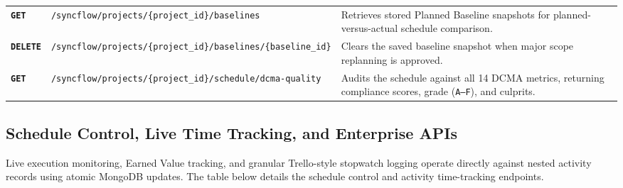 \begin{table}[H]
\begin{tabularx}{\textwidth}{p{1.3cm} >{\raggedright\arraybackslash}p{6.0cm} X}
\textbf{\texttt{GET}} & \texttt{/syncflow/projects/\{project\_id\}/\allowbreak baselines} & Retrieves stored Planned Baseline snapshots for planned-versus-actual schedule comparison. \\
\textbf{\texttt{DELETE}} & \texttt{/syncflow/projects/\{project\_id\}/\allowbreak baselines/\{baseline\_id\}} & Clears the saved baseline snapshot when major scope replanning is approved. \\
\textbf{\texttt{GET}} & \texttt{/syncflow/projects/\{project\_id\}/\allowbreak schedule/dcma-quality} & Audits the schedule against all 14 DCMA metrics, returning compliance scores, grade (\texttt{A--F}), and culprits. \\
\bottomrule
\end{tabularx}
\end{table}

\newpage

\subsection{Schedule Control, Live Time Tracking, and Enterprise APIs}
Live execution monitoring, Earned Value tracking, and granular Trello-style stopwatch logging operate directly against nested activity records using atomic MongoDB updates. The table below details the schedule control and activity time-tracking endpoints.

\vspace{4mm}

